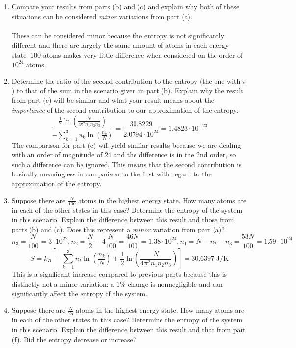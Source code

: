 \documentclass{article}
\begin{document}
\begin{enumerate}
\begin{enumerate}
            \item Compare your results from parts (b) and (c) and explain why both of these situations can be considered \textit{minor} variations from part (a).
            \\
            \\ These can be considered minor because the entropy is not significantly different and there are largely the same amount of atoms in each energy state. 100 atoms makes very little difference when considered on the order of $10^{24}$ atoms.
            \item Determine the ratio of the second contribution to the entropy (the one with $\pi$) to that of the sum in the scenario given in part (b). Explain why the result from part (c) will be similar and what your result means about the \textit{importance} of the second contribution to our approximation of the entropy.
            \\
            \[\frac{\frac{1}{2} \ln(\frac{N}{4\pi^2n_1n_2n_3})}{-\sum_{k=1}^{3} n_k \ln(\frac{n_k}{N})} = \frac{30.8229}{2.0794 \cdot 10^{24}} = \boxed{1.4823 \cdot 10^{-23}}\]
            The comparison for part (c) will yield similar results because we are dealing with an order of magnitude of 24 and the difference is in the 2nd order, so such a difference can be ignored. This means that the second contribution is basically meaningless in comparison to the first with regard to the approximation of the entropy.
            \item Suppose there are $\frac N {100}$ atoms in the highest energy state. How many atoms are in each of the other states in this case? Determine the entropy of the system in this scenario. Explain the difference between this result and those from parts (b) and (c). Does this represent a \textit{minor} variation from part (a)?
            \\
            \[n_3 = \frac{N}{100} = \boxed{3 \cdot 10^{22}}, n_2 = \frac{N}{2} - 4\frac{N}{100} = \frac{46N}{100} = \boxed{1.38 \cdot 10^{24}}, n_1 = N - n_2 - n_3 = \frac{53N}{100} = \boxed{1.59 \cdot 10^{24}}\]
            \[S = k_B \left[-\sum_{k=1}^{3} n_k \ln(\frac{n_k}{N}) + \frac 1 2 \ln(\frac{N}{4\pi^2n_1n_2n_3})\right] = \boxed{30.6397 \text{ J/K}}\]
            This is a significant increase compared to previous parts because this is distinctly not a minor variation: a 1\% change is nonnegligible and can significantly affect the entropy of the system.
            \item Suppose there are $\frac N {25}$ atoms in the highest energy state. How many atoms are in each of the other states in this case? Determine the entropy of the system in this scenario. Explain the difference between this result and that from part (f). Did the entropy decrease or increase?

\end{enumerate}
\end{enumerate}
\end{document}

